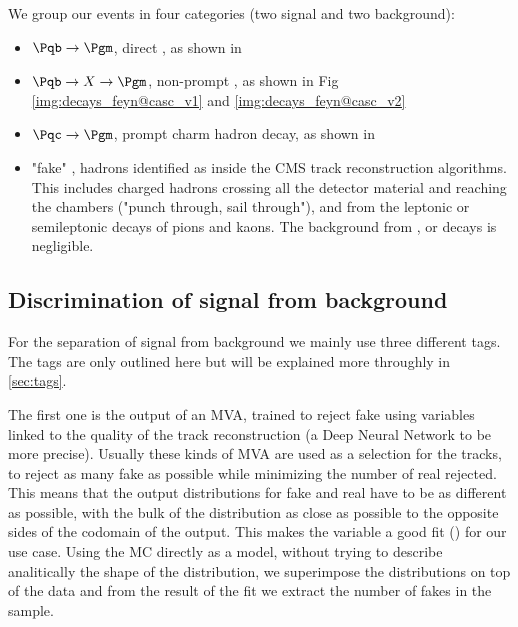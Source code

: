 We group our events in four categories (two signal and two background):
\begin{itemize}
	\item $\Pqb\to\Pgm$, direct \Pgm, as shown in 
	\item $\Pqb\to X\to\Pgm$, non-prompt \Pgm, as shown in Fig \ref{img:decays_feyn@casc_v1} and \ref{img:decays_feyn@casc_v2}
	\item $\Pqc\to\Pgm$, prompt charm hadron decay, as shown in 
	\item "fake" \Pgm, hadrons identified as \Pgm inside the CMS track reconstruction algorithms. This includes charged hadrons crossing all the detector material and reaching the \Pgm chambers ("punch through, sail through"), and \Pgm from the leptonic or semileptonic decays of pions and kaons. The background from \PgU, \PWpm or \PZz decays is negligible.
\end{itemize}



\subsection{Discrimination of signal from background}

For the separation of signal from background we mainly use three different tags. The tags are only outlined here but will be explained more throughly in \autoref{sec:tags}.

The first one is the output of an MVA, trained to reject fake \Pgm using variables linked to the quality of the track reconstruction (a Deep Neural Network to be more precise).
Usually these kinds of MVA are used as a selection for the tracks, to reject as many fake \Pgm as possible while minimizing the number of real \Pgm rejected.
This means that the output distributions for fake and real \Pgm have to be as different as possible, with the bulk of the distribution as close as possible to the opposite sides of the codomain of the output.
This makes the variable a good fit () for our use case.
Using the MC directly as a model, without trying to describe analitically the shape of the distribution, we superimpose the distributions on top of the data and from the result of the fit we extract the number of fakes in the sample.

